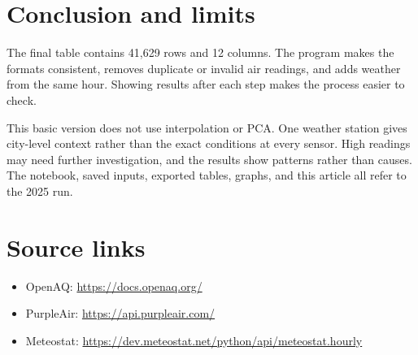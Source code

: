 \documentclass[11pt,a4paper]{article}
\begin{document}
\section{Conclusion and limits}
The final table contains 41,629 rows and 12 columns. The program makes the formats consistent, removes duplicate or invalid air readings, and adds weather from the same hour. Showing results after each step makes the process easier to check.

This basic version does not use interpolation or PCA. One weather station gives city-level context rather than the exact conditions at every sensor. High readings may need further investigation, and the results show patterns rather than causes. The notebook, saved inputs, exported tables, graphs, and this article all refer to the 2025 run.
\section*{Source links}
\begin{itemize}
\item OpenAQ: \url{https://docs.openaq.org/}
\item PurpleAir: \url{https://api.purpleair.com/}
\item Meteostat: \url{https://dev.meteostat.net/python/api/meteostat.hourly}
\end{itemize}
\end{document}
